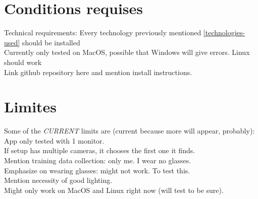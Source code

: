 \section{Conditions requises}
Technical requirements: Every technology previously mentioned \ref{technologies-used} should be installed \\

Currently only tested on MacOS, possible that Windows will give errors. Linux should work\\

Link github repository here and mention install instructions.\\

\section{Limites}
Some of the \emph{CURRENT} limits are (current because more will appear, probably):
App only tested with 1 monitor.\\
If setup has multiple cameras, it chooses the first one it finds.\\
Mention training data collection: only me. I wear no glasses.\\
Emphasize on wearing glasses: might not work. To test this.\\

Mention necessity of good lighting.\\

Might only work on MacOS and Linux right now (will test to be sure).
